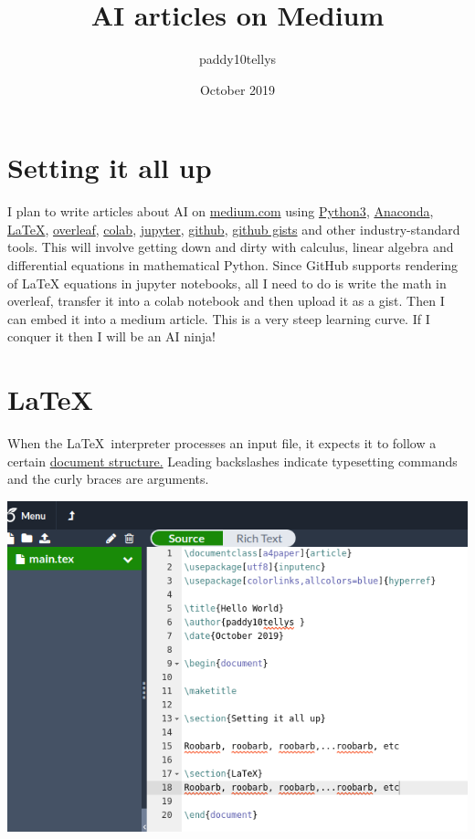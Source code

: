 \documentclass[a4paper]{article}
\title{AI articles on Medium}
\author{paddy10tellys }
\date{October 2019}
\begin{document}
\maketitle

\section{Setting it all up}

I plan to write articles about AI on \href{https://medium.com/}{medium.com} using \hyperlink{https://www.python.org/}{Python3}, \hyperlink{https://www.anaconda.com/}{Anaconda},   \href{https://www.latex-project.org/}{LaTeX}, \href{https://overleaf.com}{overleaf}, \hyperlink{https://colab.research.google.com/notebooks/welcome.ipynb}{colab}, \hyperlink{https://jupyter.org/}{jupyter}, \hyperlink{https://github.com/}{github}, \hyperlink{https://gist.github.com/}{github gists} and other industry-standard tools. This will involve getting down and dirty with calculus, linear algebra and differential equations in mathematical Python. Since GitHub supports rendering of LaTeX equations in jupyter notebooks, all I need to do is write the math in overleaf, transfer it into a colab notebook and then upload it as a gist. Then I can embed it into a medium article. This is a very steep learning curve. If I conquer it then I will be an AI ninja!

\section{LaTeX}

When the \LaTeX\ interpreter processes an input file, it expects it to follow a certain \href{https://en.wikibooks.org/wiki/LaTeX/Document_Structure}{document structure.} Leading backslashes indicate typesetting commands and the curly braces are arguments.

\noindent
\includegraphics[width=\linewidth]{4.png}
\end{document}

